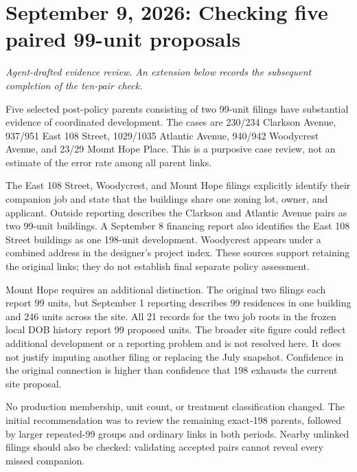 \clearpage
\section*{September 9, 2026: Checking five paired 99-unit proposals}
\textit{Agent-drafted evidence review.}
\textit{An extension below records the subsequent completion of the ten-pair check.}

Five selected post-policy parents consisting of two 99-unit filings have substantial evidence of coordinated development. The cases are 230/234 Clarkson Avenue, 937/951 East 108 Street, 1029/1035 Atlantic Avenue, 940/942 Woodycrest Avenue, and 23/29 Mount Hope Place. This is a purposive case review, not an estimate of the error rate among all parent links.

The East 108 Street, Woodycrest, and Mount Hope filings explicitly identify their companion job and state that the buildings share one zoning lot, owner, and applicant. Outside reporting describes the Clarkson and Atlantic Avenue pairs as two 99-unit buildings. A September 8 financing report also identifies the East 108 Street buildings as one 198-unit development. Woodycrest appears under a combined address in the designer's project index. These sources support retaining the original links; they do not establish final separate policy assessment.

Mount Hope requires an additional distinction. The original two filings each report 99 units, but September 1 reporting describes 99 residences in one building and 246 units across the site. All 21 records for the two job roots in the frozen local DOB history report 99 proposed units. The broader site figure could reflect additional development or a reporting problem and is not resolved here. It does not justify imputing another filing or replacing the July snapshot. Confidence in the original connection is higher than confidence that 198 exhausts the current site proposal.

No production membership, unit count, or treatment classification changed. The initial recommendation was to review the remaining exact-198 parents, followed by larger repeated-99 groups and ordinary links in both periods. Nearby unlinked filings should also be checked: validating accepted pairs cannot reveal every missed companion.

